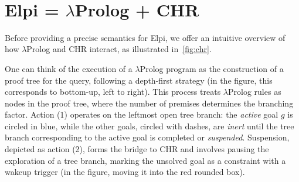 \documentclass{these-ISSS}
\newenvironment{elpicode}
  {\VerbatimEnvironment\begin{elpibox}\begin{xelpicode}}{\end{xelpicode}
\end{elpibox}}
\begin{document}






\newpage
~
\newpage
\section{Elpi = $\lambda$Prolog + CHR}\label{sec:elpiLP+CHR}


Before providing a precise semantics for Elpi, we offer an intuitive overview of
how $\lambda$Prolog and CHR interact, as illustrated in~\cref{fig:chr}.

One can think of the execution of a $\lambda$Prolog program as the construction
of a proof tree for the query, following a depth-first strategy (in the figure,
this corresponds to bottom-up, left to right). This process treats
$\lambda$Prolog rules as nodes in the proof tree, where the number of premises
determines the branching factor. Action (1) operates on the leftmost open tree
branch: the \emph{active} goal $g$ is circled in blue, while the other goals,
circled with dashes, are \emph{inert} until the tree branch corresponding to the
active goal is completed or \emph{suspended}. Suspension, depicted as action (2),
forms the bridge to CHR and involves pausing the exploration of a tree branch,
marking the unsolved goal as a constraint with a wakeup trigger (in the figure,
moving it into the red rounded box).
\end{document}
